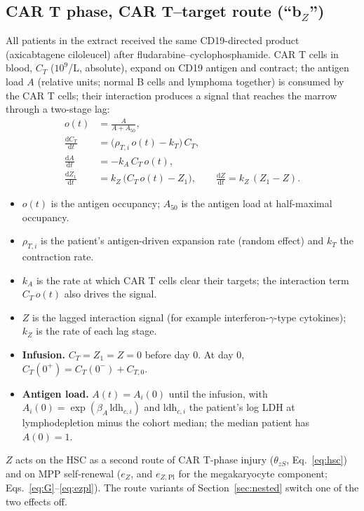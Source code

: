 \documentclass[11pt]{article}
\newcommand{\dd}{\mathrm{d}}
\begin{document}
\subsection{CAR T phase, CAR T--target route \texorpdfstring{(``b$_Z$'')}{(b-Z)}}\label{sec:cart}
All patients in the extract received the same CD19-directed product (axicabtagene ciloleucel) after fludarabine--cyclophosphamide. CAR T cells in blood, $C_T$ ($10^9$/L, absolute), expand on CD19 antigen and contract; the antigen load $A$ (relative units; normal B cells and lymphoma together) is consumed by the CAR T cells; their interaction produces a signal that reaches the marrow through a two-stage lag:
\begin{align}
o(t) &= \frac{A}{A + A_{50}}, \label{eq:occ}\\
\frac{\dd C_T}{\dd t} &= \bigl(\rho_{T,i}\, o(t) - k_T\bigr)\, C_T, \label{eq:cart}\\
\frac{\dd A}{\dd t} &= -k_A\, C_T\, o(t), \label{eq:antigen}\\
\frac{\dd Z_1}{\dd t} &= k_Z\,\bigl(C_T\,o(t) - Z_1\bigr), \qquad \frac{\dd Z}{\dd t} = k_Z\,(Z_1 - Z). \label{eq:zlag}
\end{align}
\begin{itemize}
\item $o(t)$ is the antigen occupancy; $A_{50}$ is the antigen load at half-maximal occupancy.
\item $\rho_{T,i}$ is the patient's antigen-driven expansion rate (random effect) and $k_T$ the contraction rate.
\item $k_A$ is the rate at which CAR T cells clear their targets; the interaction term $C_T\,o(t)$ also drives the signal.
\item $Z$ is the lagged interaction signal (for example interferon-$\gamma$-type cytokines); $k_Z$ is the rate of each lag stage.
\item \textbf{Infusion.} $C_T=Z_1=Z=0$ before day 0. At day 0, $C_T(0^+)=C_T(0^-)+C_{T,0}$.
\item \textbf{Antigen load.} $A(t)=A_i(0)$ until the infusion, with $A_i(0)=\exp(\beta_A\,\mathrm{ldh}_{c,i})$ and $\mathrm{ldh}_{c,i}$ the patient's log LDH at lymphodepletion minus the cohort median; the median patient has $A(0)=1$.
\end{itemize}
$Z$ acts on the HSC as a second route of CAR T-phase injury ($\theta_{zS}$, Eq.~\ref{eq:hsc}) and on MPP self-renewal ($e_Z$, and $e_{Z,\mathrm{Pl}}$ for the megakaryocyte component; Eqs.~\ref{eq:G}--\ref{eq:ezpl}). The route variants of Section~\ref{sec:nested} switch one of the two effects off.
\end{document}
